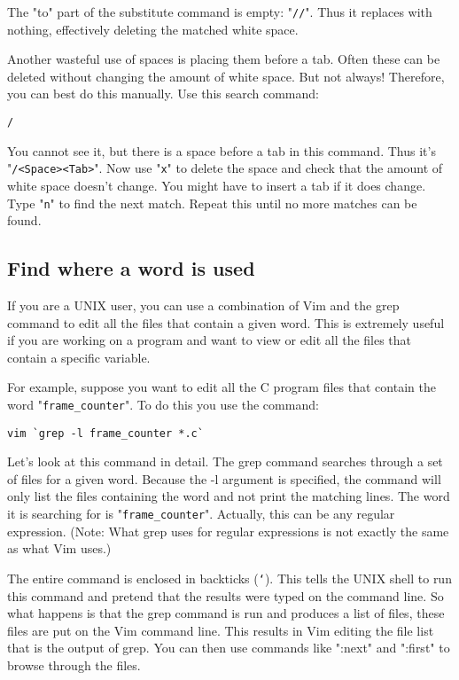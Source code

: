 The "to" part of the substitute command is empty: "\texttt{//}".
Thus it replaces with nothing, effectively deleting the matched white space.

Another wasteful use of spaces is placing them before a tab.
Often these can be deleted without changing the amount of white space.
But not always!  Therefore, you can best do this manually.
Use this search command:

\begin{Verbatim}[samepage=true]
 /   
\end{Verbatim}

You cannot see it, but there is a space before a tab in this command.
Thus it's "\texttt{/<Space><Tab>}".
Now use "\texttt{x}" to delete the space and check that the amount of white space doesn't change.
You might have to insert a tab if it does change.
Type "\texttt{n}" to find the next match.
Repeat this until no more matches can be found.
\subsection{Find where a word is used}
If you are a UNIX user, you can use a combination of Vim and the grep command to edit all the files that contain a given word.
This is extremely useful if you are working on a program and want to view or edit all the files that contain a specific variable.

For example, suppose you want to edit all the C program files that contain the word "\texttt{frame\_counter}".
To do this you use the command:

\begin{Verbatim}[samepage=true]
 vim `grep -l frame_counter *.c`
\end{Verbatim}

Let's look at this command in detail.
The grep command searches through a set of files for a given word.
Because the -l argument is specified, the command will only list the files containing the word and not print the matching lines.
The word it is searching for is "\texttt{frame\_counter}".
Actually, this can be any regular expression.
(Note: What grep uses for regular expressions is not exactly the same as what Vim uses.)

The entire command is enclosed in backticks (\texttt{`}).
This tells the UNIX shell to run this command and pretend that the results were typed on the command line.
So what happens is that the grep command is run and produces a list of files, these files are put on the Vim command line.
This results in Vim editing the file list that is the output of grep.
You can then use commands like ":next" and ":first" to browse through the files.

